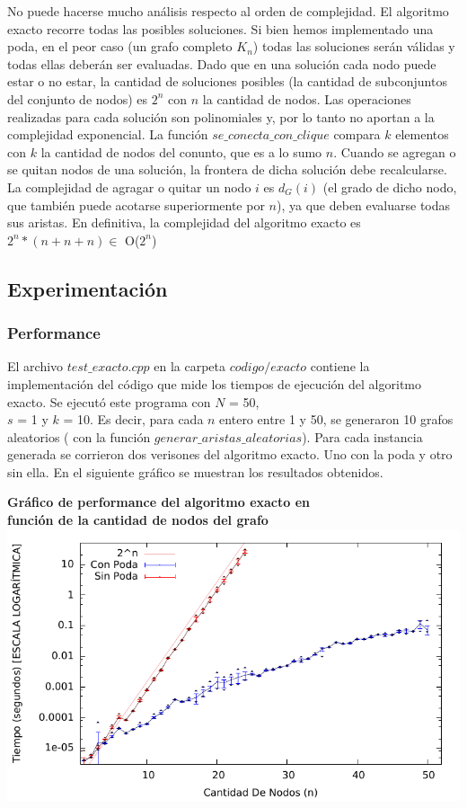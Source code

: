 \par{No puede hacerse mucho análisis respecto al orden de complejidad. El
algoritmo exacto recorre todas las posibles soluciones. Si bien hemos
implementado una poda, en el peor caso (un grafo completo $K_n$) todas las
soluciones serán válidas y todas ellas deberán ser evaluadas. Dado que en
una solución cada nodo puede estar o no estar, la cantidad de soluciones
posibles (la cantidad de subconjuntos del conjunto de nodos) es $2^n$ con
$n$ la cantidad de nodos. Las operaciones realizadas para cada solución son
polinomiales y, por lo tanto no aportan a la complejidad exponencial. La
función $se\_conecta\_con\_clique$ compara $k$ elementos con $k$ la cantidad
de nodos del conunto, que es a lo sumo $n$. Cuando se agregan o se quitan
nodos de una solución, la frontera de dicha solución debe recalcularse. La
complejidad de agragar o quitar un nodo $i$ es $d_G(i)$ (el grado de dicho
nodo, que también puede acotarse superiormente por $n$), ya que deben
evaluarse todas sus aristas. En definitiva, la complejidad del algoritmo
exacto es $2^n * ( n + n + n ) \in$ O($2^n$)}

\subsection{Experimentación}

\subsubsection{Performance}

\par{El archivo $test\_exacto.cpp$ en la carpeta $codigo/exacto$ contiene la
implementación del código que mide los tiempos de ejecución del algoritmo
exacto. Se ejecutó este programa con $N$ = 50,\\$s$ = 1 y $k$ = 10. Es decir,
para cada $n$ entero entre 1 y 50, se generaron 10 grafos aleatorios (
con la función $generar\_aristas\_aleatorias$). Para cada instancia generada se
corrieron dos verisones del algoritmo exacto. Uno con la poda y otro sin ella.
En el siguiente gráfico se muestran los resultados obtenidos.}

\begin{center}
\textbf{Gráfico de performance del algoritmo exacto en\\función de la cantidad
de nodos del grafo}
\includegraphics[scale=1.3]{imgs/exacto_50_1_10.pdf}
\end{center}

